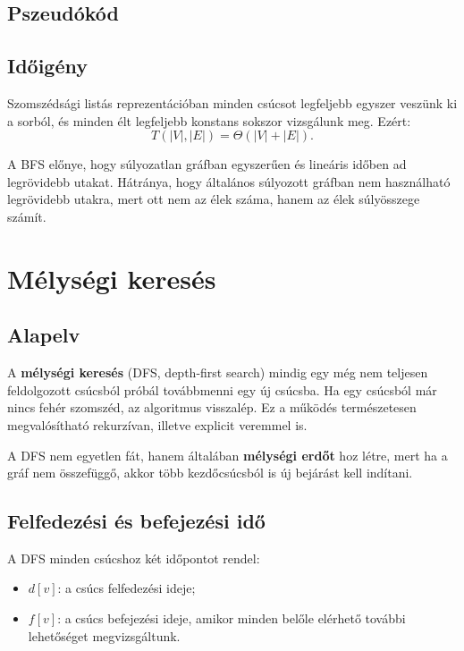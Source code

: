 \subsection{Pszeudókód}


\subsection{Időigény}

Szomszédsági listás reprezentációban minden csúcsot legfeljebb egyszer veszünk ki a sorból, és minden élt legfeljebb konstans sokszor vizsgálunk meg. Ezért:
\[
T(|V|,|E|)=\Theta(|V|+|E|).
\]

A BFS előnye, hogy súlyozatlan gráfban egyszerűen és lineáris időben ad legrövidebb utakat. Hátránya, hogy általános súlyozott gráfban nem használható legrövidebb utakra, mert ott nem az élek száma, hanem az élek súlyösszege számít.

\section{Mélységi keresés}

\subsection{Alapelv}

A \textbf{mélységi keresés} (DFS, depth-first search) mindig egy még nem teljesen feldolgozott csúcsból próbál továbbmenni egy új csúcsba. Ha egy csúcsból már nincs fehér szomszéd, az algoritmus visszalép. Ez a működés természetesen megvalósítható rekurzívan, illetve explicit veremmel is.

A DFS nem egyetlen fát, hanem általában \textbf{mélységi erdőt} hoz létre, mert ha a gráf nem összefüggő, akkor több kezdőcsúcsból is új bejárást kell indítani.

\subsection{Felfedezési és befejezési idő}

A DFS minden csúcshoz két időpontot rendel:

\begin{itemize}
  \item $d[v]$: a csúcs felfedezési ideje;
  \item $f[v]$: a csúcs befejezési ideje, amikor minden belőle elérhető további lehetőséget megvizsgáltunk.
\end{itemize}

